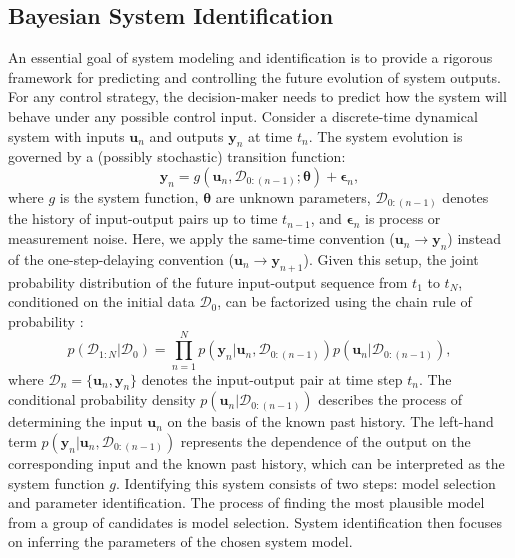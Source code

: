 \subsection{Bayesian System Identification}
An essential goal of system modeling and identification is to provide a rigorous framework for predicting and controlling the future evolution of system outputs. For any control strategy, the decision-maker needs to predict how the system will behave under any possible control input. Consider a discrete-time dynamical system with inputs $\boldsymbol{u}_{n}$ and outputs $\boldsymbol{y}_{n}$ at time $t_n$. The system evolution is governed by a (possibly stochastic) transition function:
\begin{equation}
    \boldsymbol{y}_{n} = g(\boldsymbol{u}_{n}, \mathcal{D}_{0:(n-1)}; \boldsymbol{\theta}) + \boldsymbol{\epsilon}_n,
\end{equation}
where $g$ is the system function, $\boldsymbol{\theta}$ are unknown parameters, $\mathcal{D}_{0:(n-1)}$ denotes the history of input-output pairs up to time $t_{n-1}$, and $\boldsymbol{\epsilon}_n$ is process or measurement noise. Here, we apply the same-time convention ($\boldsymbol{u}_{n}\rightarrow \boldsymbol{y}_{n}$) instead of the one-step-delaying convention ($\boldsymbol{u}_{n}\rightarrow \boldsymbol{y}_{n+1}$). Given this setup, the joint probability distribution of the future input-output sequence from $t_1$ to $t_N$, conditioned on the initial data $\mathcal{D}_{0}$, can be factorized using the chain rule of probability \citep{BayesSysId1981}:
\begin{equation}
    p(\mathcal{D}_{1:N}|\mathcal{D}_{0})=\prod _{n=1}^{N}p(\boldsymbol{y}_{n}|\boldsymbol{u}_{n}, \mathcal{D}_{0:(n-1)})p(\boldsymbol{u}_{n}|\mathcal{D}_{0:(n-1)}),
\end{equation}
where $\mathcal{D}_{n}=\{\boldsymbol{u}_{n}, \boldsymbol{y}_{n}\}$ denotes the input-output pair at time step $t_n$.
The conditional probability density $p(\boldsymbol{u}_{n}|\mathcal{D}_{0:(n-1)})$ describes the process of determining the input $\boldsymbol{u}_{n}$ on the basis of the known past history. The left-hand term $p(\boldsymbol{y}_{n}|\boldsymbol{u}_{n}, \mathcal{D}_{0:(n-1)})$ represents the dependence of the output on the corresponding input and the known past history, which can be interpreted as the system function $g$. Identifying this system consists of two steps: model selection and parameter identification. The process of finding the most plausible model from a group of candidates is model selection. System identification then focuses on inferring the parameters of the chosen system model.
